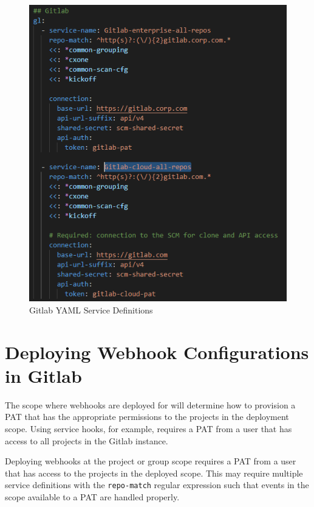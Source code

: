 \begin{figure}[h]
    \includegraphics[width=\textwidth]{graphics/gl-yaml.png}
    \caption{Gitlab YAML Service Definitions}
    \label{fig:gl-yaml}
\end{figure}


\section{Deploying Webhook Configurations in Gitlab}

The scope where webhooks are deployed for \cxoneflow will determine how to provision a PAT
that has the appropriate permissions to the projects in the deployment scope.  Using service
hooks, for example, requires a PAT from a user that has access to all projects in the Gitlab
instance.

Deploying webhooks at the project or group scope requires a PAT from a user that has access
to the projects in the deployed scope.  This may require multiple \cxoneflow service definitions
with the \texttt{repo-match} regular expression such that events in the scope available to a
PAT are handled properly.

